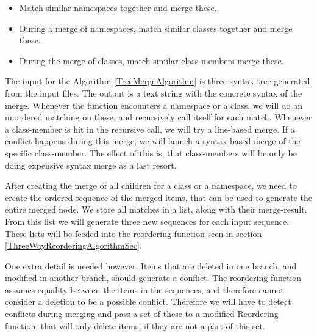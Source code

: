 \documentclass[11pt]{article}
\begin{document}
\begin{itemize}
   \item Match similar namespaces together and merge these.
   \item During a merge of namespaces, match similar classes together and merge these.
   \item During the merge of classes, match similar class-members merge these.
\end{itemize}

The input for the Algorithm \ref{TreeMergeAlgorithm} is three syntax tree generated from the input files. The output is a text string with the concrete syntax of the merge. Whenever the function encounters a namespace or a class, we will do an unordered matching on these, and recursively call itself for each match. Whenever a class-member is hit in the recursive call, we will try a line-based merge. If a conflict happens during this merge, we will launch a syntax based merge of the specific class-member. The effect of this is, that class-members will be only be doing expensive syntax merge as a last resort.

After creating the merge of all children for a class or a namespace, we need to create the ordered sequence of the merged items, that can be used to generate the entire merged node. We store all matches in a list, along with their merge-result. From this list we will generate three new sequences for each input sequence. These lists will be feeded into the reordering function seen in section \ref{ThreeWayReorderingAlgorithmSec}.

One extra detail is needed however. Items that are deleted in one branch, and modified in another branch, should generate a conflict. The reordering function assumes equality between the items in the sequences, and therefore cannot consider a deletion to be a possible conflict. Therefore we will have to detect conflicts during merging and pass a set of these to a modified Reordering function, that will only delete items, if they are not a part of this set.
\end{document}
